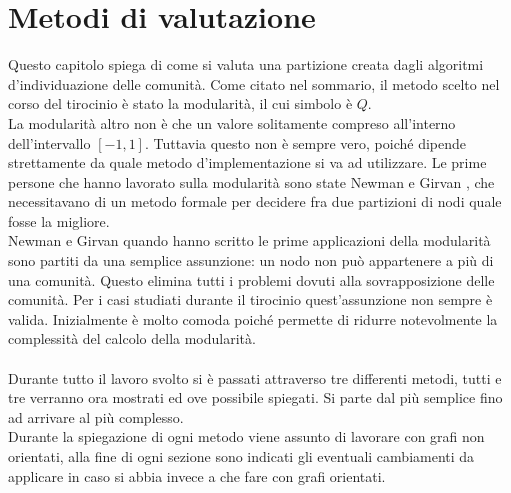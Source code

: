 %
%
\chapter{Metodi di valutazione}\label{chap:2}
Questo capitolo spiega di come si valuta una partizione creata dagli algoritmi d'individuazione delle comunità. Come citato nel sommario, il metodo scelto nel corso del tirocinio è stato la modularità, il cui simbolo è $Q$.\\
La modularità altro non è che un valore solitamente compreso all'interno dell'intervallo $[-1, 1]$. Tuttavia questo non è sempre vero, poiché dipende strettamente da quale metodo d'implementazione si va ad utilizzare. Le prime persone che hanno lavorato sulla modularità sono state Newman e Girvan , che necessitavano di un metodo formale per decidere fra due partizioni di nodi quale fosse la migliore.\\
Newman e Girvan  quando hanno scritto le prime applicazioni della modularità sono partiti da una semplice assunzione: un nodo non può appartenere a più di una comunità. Questo elimina tutti i problemi dovuti alla sovrapposizione delle comunità. Per i casi studiati durante il tirocinio quest'assunzione non sempre è valida. Inizialmente è molto comoda poiché permette di ridurre notevolmente la complessità del calcolo della modularità.\\
\\
Durante tutto il lavoro svolto si è passati attraverso tre differenti metodi, tutti e tre verranno ora mostrati ed ove possibile spiegati. Si parte dal più semplice fino ad arrivare al più complesso.\\ Durante la spiegazione di ogni metodo viene assunto di lavorare con grafi non orientati, alla fine di ogni sezione sono indicati gli eventuali cambiamenti da applicare in caso si abbia invece a che fare con grafi orientati.
%
